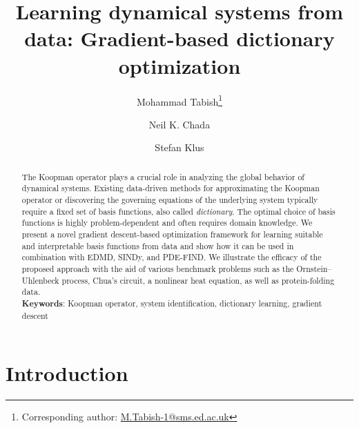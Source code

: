 \documentclass
[
    a4paper,
    DIV=11,
    abstract=true,
    11pt,
]
{scrartcl}
\theoremstyle{definition}
\begin{document}
\title{Learning dynamical systems from data: Gradient-based dictionary optimization}
\author[1]{Mohammad Tabish\thanks{Corresponding author: \href{mailto:M.Tabish-1@sms.ed.ac.uk}{M.Tabish-1@sms.ed.ac.uk}}}
\author[2]{Neil K. Chada}
\author[3]{Stefan Klus}
\date{}
\maketitle

\begin{abstract}
The Koopman operator plays a crucial role in analyzing the global behavior of dynamical systems. Existing data-driven methods for approximating the Koopman operator or discovering the governing equations of the underlying system typically require a fixed set of basis functions, also called \emph{dictionary}. The optimal choice of basis functions is highly problem-dependent and often requires domain knowledge. We present a novel gradient descent-based optimization framework for learning suitable and interpretable basis functions from data and show how it can be used in combination with EDMD, SINDy, and PDE-FIND. We illustrate the efficacy of the proposed approach with the aid of various benchmark problems such as the Ornstein--Uhlenbeck process, Chua's circuit, a nonlinear heat equation, as well as protein-folding data. \\[1ex] { \footnotesize\textbf{Keywords}: Koopman operator, system identification, dictionary learning, gradient descent }
\end{abstract}

\section{Introduction}
\end{document}
